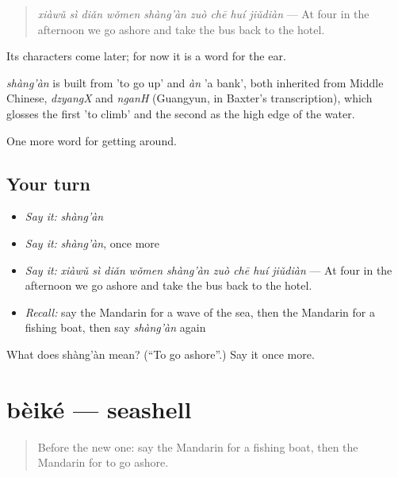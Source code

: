 \begin{quote}
\emph{xiàwǔ sì diǎn wǒmen shàng'àn zuò chē huí jiǔdiàn} — At four in the afternoon we go ashore and take the bus back to the hotel.
\end{quote}

Its characters come later; for now it is a word for the ear.

\begin{cousinweb}
\emph{shàng'àn} is built from  'to go up' and \emph{àn} 'a bank', both inherited from Middle Chinese, \emph{dzyangX} and \emph{nganH} (Guangyun, in Baxter's transcription), which glosses the first 'to climb' and the second as the high edge of the water.
\end{cousinweb}

\begin{grammarlens}[title={What you've built}]
One more word for getting around.
\end{grammarlens}

\subsection*{Your turn}
\begin{itemize}
\raggedright
  \item \emph{Say it:} \emph{shàng'àn}
  \item \emph{Say it:} \emph{shàng'àn}, once more
  \item \emph{Say it:} \emph{xiàwǔ sì diǎn wǒmen shàng'àn zuò chē huí jiǔdiàn} — At four in the afternoon we go ashore and take the bus back to the hotel.
  \item \emph{Recall:} say the Mandarin for a wave of the sea, then the Mandarin for a fishing boat, then say \emph{shàng'àn} again
\end{itemize}

\begin{tcolorbox}[breakable,colback=teal!4,colframe=teal!35!black,title={Before you move on}]
What does shàng'àn mean? (\textquotedblleft{}To go ashore\textquotedblright{}.) Say it once more.
\end{tcolorbox}
\section[bèiké]{bèiké — seashell}

\label{lesson:ZH-C445-beike}



\begin{quote}
Before the new one: say the Mandarin for a fishing boat, then the Mandarin for to go ashore.
\end{quote}

